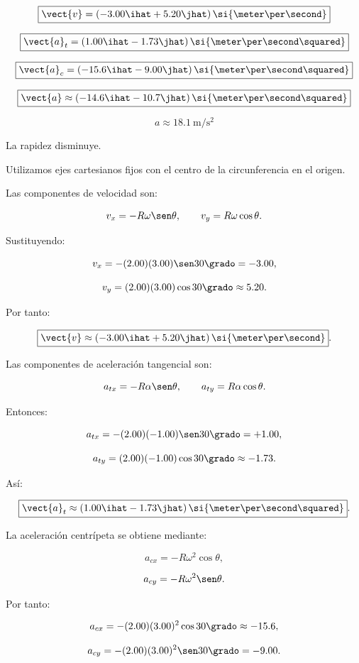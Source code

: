 \begin{respuesta}
\[
\boxed{
\vect{v}
=(-3.00\ihat+5.20\jhat)\,
\si{\meter\per\second}
}
\]

\[
\boxed{
\vect{a}_t
=(1.00\ihat-1.73\jhat)\,
\si{\meter\per\second\squared}
}
\]

\[
\boxed{
\vect{a}_c
=(-15.6\ihat-9.00\jhat)\,
\si{\meter\per\second\squared}
}
\]

\[
\boxed{
\vect{a}
\approx(-14.6\ihat-10.7\jhat)\,
\si{\meter\per\second\squared}
}
\]

\[
\boxed{a\approx\SI{18.1}{\meter\per\second\squared}}
\]

La rapidez disminuye.
\end{respuesta}

\begin{explicacion}
Utilizamos ejes cartesianos fijos con el centro de la
circunferencia en el origen.

Las componentes de velocidad son:

\[
v_x=-R\omega\sen\theta,
\qquad
v_y=R\omega\cos\theta.
\]

Sustituyendo:

\[
v_x=-(2.00)(3.00)\sen30\grado=-3.00,
\]

\[
v_y=(2.00)(3.00)\cos30\grado\approx5.20.
\]

Por tanto:

\[
\boxed{
\vect{v}
\approx(-3.00\ihat+5.20\jhat)\,
\si{\meter\per\second}
}.
\]

Las componentes de aceleración tangencial son:

\[
a_{tx}=-R\alpha\sen\theta,
\qquad
a_{ty}=R\alpha\cos\theta.
\]

Entonces:

\[
a_{tx}=-(2.00)(-1.00)\sen30\grado=+1.00,
\]

\[
a_{ty}=(2.00)(-1.00)\cos30\grado\approx-1.73.
\]

Así:

\[
\boxed{
\vect{a}_t
\approx(1.00\ihat-1.73\jhat)\,
\si{\meter\per\second\squared}
}.
\]

La aceleración centrípeta se obtiene mediante:

\[
a_{cx}=-R\omega^2\cos\theta,
\]

\[
a_{cy}=-R\omega^2\sen\theta.
\]

Por tanto:

\[
a_{cx}=-(2.00)(3.00)^2\cos30\grado\approx-15.6,
\]

\[
a_{cy}=-(2.00)(3.00)^2\sen30\grado=-9.00.
\]


\end{explicacion}
